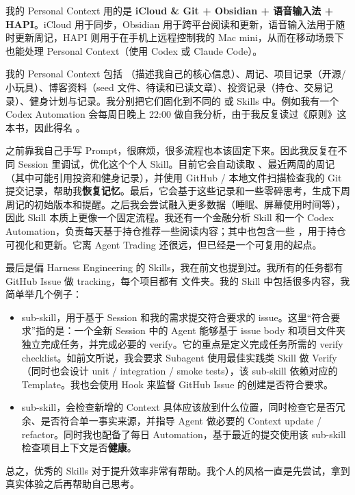 我的 Personal Context 用的是 \textbf{iCloud \& Git + Obsidian + 语音输入法 + HAPI}。iCloud 用于同步，Obsidian 用于跨平台阅读和更新，语音输入法用于随时更新周记，HAPI 则用于在手机上远程控制我的 Mac mini，从而在移动场景下也能处理 Personal Context（使用 Codex 或 Claude Code）。

我的 Personal Context 包括 （描述我自己的核心信息）、周记、项目记录（开源/小玩具）、博客资料（seed 文件、待读和已读文章）、投资记录（持仓、交易记录）、健身计划与记录。我分别把它们固化到不同的  或 Skills 中。例如我有一个 Codex Automation 会每周日晚上 22:00 做自我分析，由于我反复读过《原则》这本书，因此得名 。

之前靠我自己手写 Prompt，很麻烦，很多流程也本该固定下来。因此我反复在不同 Session 里调试，优化这个个人 Skill。目前它会自动读取 、最近两周的周记（其中可能引用投资和健身记录），并使用 GitHub / 本地文件扫描检查我的 Git 提交记录，帮助我\textbf{恢复记忆}。最后，它会基于这些记录和一些零碎思考，生成下周周记的初始版本和提醒。之后我会尝试融入更多数据（睡眠、屏幕使用时间等），因此  Skill 本质上更像一个固定流程。我还有一个金融分析 Skill 和一个 Codex Automation，负责每天基于持仓推荐一些阅读内容；其中也包含一些 ，用于持仓可视化和更新。它离 Agent Trading 还很远，但已经是一个可复用的起点。

最后是偏 Harness Engineering 的 Skills，我在前文也提到过。我所有的任务都有 GitHub Issue 做 tracking，每个项目都有  文件夹。我的 Skill 中包括很多内容，我简单举几个例子：

\begin{itemize}
  \item {} sub-skill，用于基于 Session 和我的需求提交符合要求的 issue。这里“符合要求”指的是：一个全新 Session 中的 Agent 能够基于 issue body 和项目文件夹独立完成任务，并完成必要的 verify。它的重点是定义完成任务所需的 verify checklist。如前文所说，我会要求 Subagent 使用最佳实践类 Skill 做 Verify（同时也会设计 unit / integration / smoke tests），该 sub-skill 依赖对应的 Template。我也会使用 Hook 来监督 GitHub Issue 的创建是否符合要求。
  \item {} sub-skill，会检查新增的 Context 具体应该放到什么位置，同时检查它是否冗余、是否符合单一事实来源，并指导 Agent 做必要的 Context update / refactor。同时我也配备了每日 Automation，基于最近的提交使用该 sub-skill 检查项目上下文是否\textbf{健康}。
\end{itemize}

总之，优秀的 Skills 对于提升效率非常有帮助。我个人的风格一直是先尝试，拿到真实体验之后再帮助自己思考。
